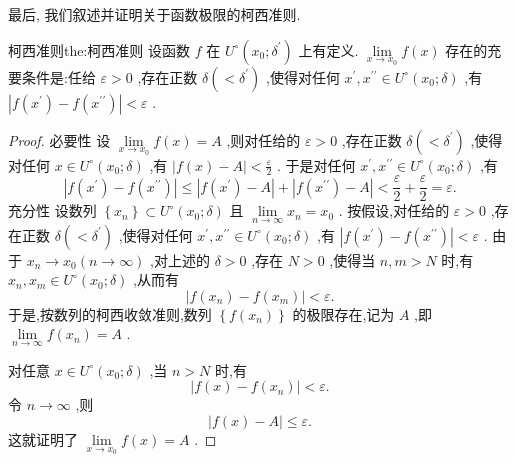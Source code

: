 最后, 我们叙述并证明关于函数极限的柯西准则.

\begin{theorem}{柯西准则}{the:柯西准则}
设函数 \(f\) 在 \({U}^{ \circ  }\left( {{x}_{0};{\delta }^{\prime }}\right)\) 上有定义. \(\mathop{\lim }\limits_{{x \rightarrow  {x}_{0}}}f\left( x\right)\) 存在的充要条件是:任给 \(\varepsilon  > 0\) ,存在正数 \(\delta \left( { < {\delta }^{\prime }}\right)\) ,使得对任何 \({x}^{\prime },{x}^{\prime \prime } \in  {U}^{ \circ  }\left( {{x}_{0};\delta }\right)\) ,有 \(\left| {f\left( {x}^{\prime }\right)  - f\left( {x}^{\prime \prime }\right) }\right|  < \varepsilon\) .
\end{theorem}

\begin{proof}
必要性 设 \(\mathop{\lim }\limits_{{x \rightarrow  {x}_{0}}}f\left( x\right)  = A\) ,则对任给的 \(\varepsilon  > 0\) ,存在正数 \(\delta \left( { < {\delta }^{\prime }}\right)\) ,使得对任何 \(x \in  {U}^{ \circ  }\left( {{x}_{0};\delta }\right)\) ,有 \(\left| {f\left( x\right)  - A}\right|  < \frac{\varepsilon }{2}\) . 于是对任何 \({x}^{\prime },{x}^{\prime \prime } \in  {U}^{ \circ  }\left( {{x}_{0};\delta }\right)\) ,有
\[
\left| {f\left( {x}^{\prime }\right)  - f\left( {x}^{\prime \prime }\right) }\right|  \leq  \left| {f\left( {x}^{\prime }\right)  - A}\right|  + \left| {f\left( {x}^{\prime \prime }\right)  - A}\right|  < \frac{\varepsilon }{2} + \frac{\varepsilon }{2} = \varepsilon .
\]
充分性 设数列 \(\left\{  {x}_{n}\right\}   \subset  {U}^{ \circ  }\left( {{x}_{0};\delta }\right)\) 且 \(\mathop{\lim }\limits_{{n \rightarrow  \infty }}{x}_{n} = {x}_{0}\) . 按假设,对任给的 \(\varepsilon  > 0\) ,存在正数 \(\delta \left( { < {\delta }^{\prime }}\right)\) ,使得对任何 \({x}^{\prime },{x}^{\prime \prime } \in  {U}^{ \circ  }\left( {{x}_{0};\delta }\right)\) ,有 \(\left| {f\left( {x}^{\prime }\right)  - f\left( {x}^{\prime \prime }\right) }\right|  < \varepsilon\) . 由于 \({x}_{n} \rightarrow  {x}_{0}\left( {n \rightarrow  \infty }\right)\) ,对上述的 \(\delta  > 0\) ,存在 \(N > 0\) ,使得当 \(n,m > N\) 时,有 \({x}_{n},{x}_{m} \in  {U}^{ \circ  }\left( {{x}_{0};\delta }\right)\) ,从而有
\[
\left| {f\left( {x}_{n}\right)  - f\left( {x}_{m}\right) }\right|  < \varepsilon .
\]
于是,按数列的柯西收敛准则,数列 \(\left\{  {f\left( {x}_{n}\right) }\right\}\) 的极限存在,记为 \(A\) ,即 \(\mathop{\lim }\limits_{{n \rightarrow  \infty }}f\left( {x}_{n}\right)  = A\) .

对任意 \(x \in  {U}^{ \circ  }\left( {{x}_{0};\delta }\right)\) ,当 \(n > N\) 时,有
\[
\left| {f\left( x\right)  - f\left( {x}_{n}\right) }\right|  < \varepsilon .
\]
令 \(n \rightarrow  \infty\) ,则
\[
\left| {f\left( x\right)  - A}\right|  \leq  \varepsilon .
\]
这就证明了 \(\mathop{\lim }\limits_{{x \rightarrow  {x}_{0}}}f\left( x\right)  = A\) .
\end{proof}


